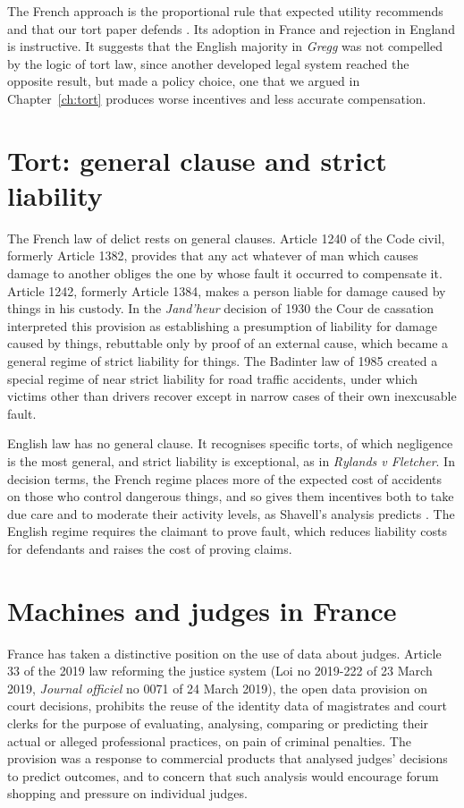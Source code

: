 The French approach is the proportional rule that expected utility recommends and that our tort paper defends \citep{polson_sokolov_tort}. Its adoption in France and rejection in England is instructive. It suggests that the English majority in \emph{Gregg} was not compelled by the logic of tort law, since another developed legal system reached the opposite result, but made a policy choice, one that we argued in Chapter~\ref{ch:tort} produces worse incentives and less accurate compensation.

\section{Tort: general clause and strict liability}

The French law of delict rests on general clauses. Article 1240 of the Code civil, formerly Article 1382, provides that any act whatever of man which causes damage to another obliges the one by whose fault it occurred to compensate it. Article 1242, formerly Article 1384, makes a person liable for damage caused by things in his custody. In the \emph{Jand'heur} decision of 1930 the Cour de cassation interpreted this provision as establishing a presumption of liability for damage caused by things, rebuttable only by proof of an external cause, which became a general regime of strict liability for things. The Badinter law of 1985 created a special regime of near strict liability for road traffic accidents, under which victims other than drivers recover except in narrow cases of their own inexcusable fault.

English law has no general clause. It recognises specific torts, of which negligence is the most general, and strict liability is exceptional, as in \emph{Rylands v Fletcher}. In decision terms, the French regime places more of the expected cost of accidents on those who control dangerous things, and so gives them incentives both to take due care and to moderate their activity levels, as Shavell's analysis predicts \citep{shavell1987}. The English regime requires the claimant to prove fault, which reduces liability costs for defendants and raises the cost of proving claims.

\section{Machines and judges in France}

France has taken a distinctive position on the use of data about judges. Article 33 of the 2019 law reforming the justice system (Loi no 2019-222 of 23 March 2019, \emph{Journal officiel} no 0071 of 24 March 2019), the open data provision on court decisions, prohibits the reuse of the identity data of magistrates and court clerks for the purpose of evaluating, analysing, comparing or predicting their actual or alleged professional practices, on pain of criminal penalties. The provision was a response to commercial products that analysed judges' decisions to predict outcomes, and to concern that such analysis would encourage forum shopping and pressure on individual judges.


